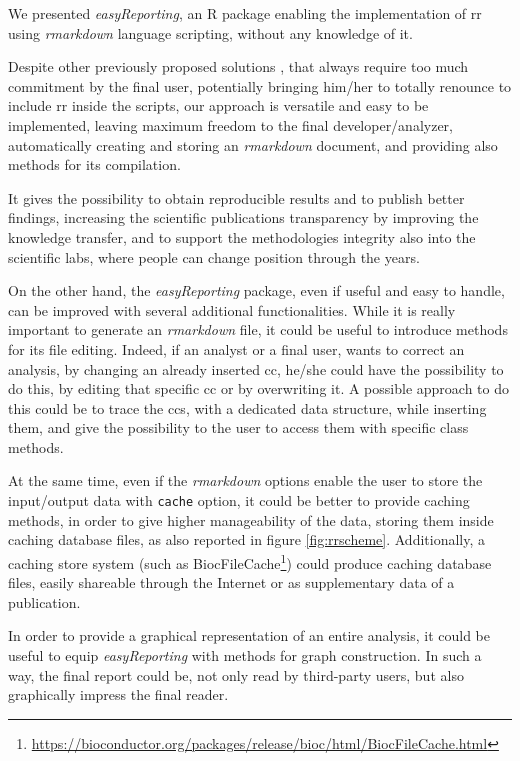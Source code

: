 We presented \textit{easyReporting}, an R package enabling the implementation of \gls{rr} using \textit{rmarkdown} language scripting, without any knowledge of it.

Despite other  previously proposed solutions \cite{Napolitano2013, Napolitano2017}, that always require too much commitment by the final user, potentially bringing him/her to totally renounce to include \gls{rr} inside the scripts, our approach is versatile and easy to be implemented, leaving maximum freedom to the final developer/analyzer, automatically creating and storing an \textit{rmarkdown} document, and providing also methods for its compilation.

It gives the possibility to obtain reproducible results and to publish better findings, increasing the scientific publications transparency by improving the knowledge transfer, and to support the methodologies integrity also into the scientific labs, where people can change position through the years.

On the other hand, the \textit{easyReporting} package, even if useful and easy to handle, can be improved with several additional functionalities.
While it is really important to generate an \textit{rmarkdown} file, it could be useful to introduce methods for its file editing. 
Indeed, if an analyst or a final user, wants to correct an analysis, by changing an already inserted \gls{cc}, he/she could have the possibility to do this, by editing that specific \gls{cc} or by overwriting it.
A possible approach to do this could be to trace the \glspl{cc}, with a dedicated data structure, while inserting them, and give the possibility to the user to access them with specific class methods.

At the same time, even if the \textit{rmarkdown} options enable the user to store the input/output data with \lstinline!cache! option, it could be better to provide caching methods, in order to give higher manageability of the data, storing them inside caching database files, as also reported in figure \ref{fig:rrscheme}.
Additionally, a caching store system (such as BiocFileCache\footnote{\url{https://bioconductor.org/packages/release/bioc/html/BiocFileCache.html}}) could produce caching database files, easily shareable through the Internet or as supplementary data of a publication.

In order to provide a graphical representation of an entire analysis, it could be useful to equip \textit{easyReporting} with methods for graph construction.
In such a way, the final report could be, not only read by third-party users, but also graphically impress the final reader.


